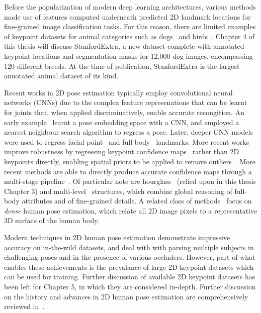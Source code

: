 Before the popularization of modern deep learning architectures, various methods made use of features computed underneath predicted 2D landmark locations for fine-grained image classification tasks. For this reason, there are limited examples of keypoint datasets for animal categories such as dogs~\cite{liu2012dog} and birds~\cite{WelinderEtal2010}. Chapter 4 of this thesis will discuss StanfordExtra, a new dataset complete with annotated keypoint locations and segmentation masks for 12,000 dog images, encompassing 120 different breeds. At the time of publication, StanfordExtra is the largest annotated animal dataset of its kind. 

Recent works in 2D pose estimation typically employ convolutional neural networks (CNNs) due to the complex feature represenations that can be learnt for joints that, when applied discriminatively, enable accurate recongition. An early example~\cite{pose-embedding} learnt a pose embedding space with a CNN, and employed a nearest neighbour search algorithm to regress a pose. Later, deeper CNN models were used to regress facial point~\cite{pose-face-earlycnn} and full body~\cite{toshev2014deeppose} landmarks. More recent works improve robustness by regressing keypoint confidence maps~\cite{joint-training} rather than 2D keypoints directly, enabling spatial priors to be applied to remove outliers~\cite{cao2018openpose,Pfister15,Pfister14a,Charles16,joint-training,viewpoints-keypoints,pishchulin2016deepcut}. More recent methods are able to directly produce accurate confidence maps through a multi-stage pipeline~\cite{wei2016cpm}. Of particular note are hourglass~\cite{newell2016stacked} (relied upon in this thesis Chapter 3) and multi-level~\cite{sun2019deep,Xiao_2018_ECCV} structures, which combine global reasoning of full-body attributes and of fine-grained details. A related class of methods~\cite{guler2018densepose, taylor2012vitruvian} focus on \emph{dense} human pose estimation, which relate all 2D image pixels to a representative 3D surface of the human body. 

Modern techniques in 2D human pose estimation demonstrate impressive accuracy on in-the-wild datasets, and deal with with parsing multiple subjects in challenging poses and in the presence of various occluders. However, part of what enables these achievements is the prevalance of large 2D keypoint datasets which can be used for training. Further discussion of available 2D keypoint datasets has been left for Chapter 5, in which they are considered in-depth. Further discussion on the history and advances in 2D human pose estimation are comprehensively reviewed in~\cite{2dpose-survey-1, 2dpose-survey-2}.

